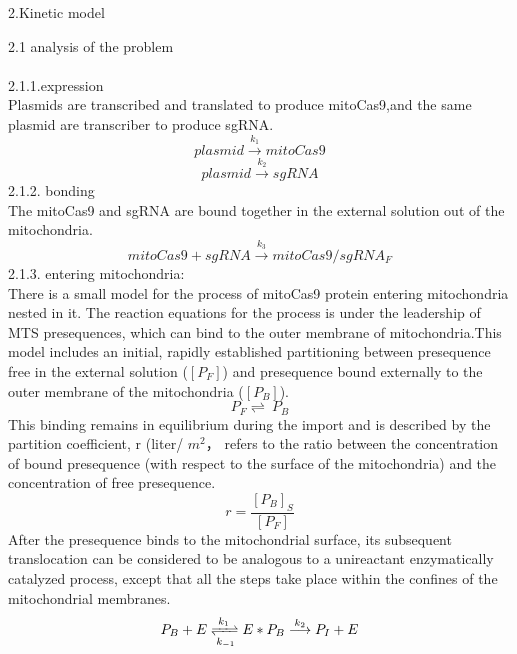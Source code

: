 \documentclass[UTF8]{ctexart}
\begin{document}
	\begin{center}
	{\Large 2.Kinetic model} 
    \end{center}
  {\Large 2.1 analysis of the problem} 
\\\\
2.1.1.expression \\
Plasmids are transcribed and translated to produce mitoCas9,and the same plasmid are transcriber to produce sgRNA.
	\begin{displaymath}
	plasmid \stackrel{k_1}{\longrightarrow} mitoCas9 
	\end{displaymath}
	\begin{displaymath}
	plasmid\stackrel{k_2}{\longrightarrow}sgRNA
	\end{displaymath}
	2.1.2. bonding \\
	The mitoCas9 and sgRNA are bound together in the external solution out of the mitochondria.
	\begin{displaymath}
	mitoCas9+sgRNA\stackrel{k_3}{\longrightarrow}mitoCas9/sgRNA_F
	\end{displaymath}
	2.1.3. entering mitochondria:\\
There is a small model for the process of mitoCas9 protein entering mitochondria nested in it.
The reaction equations for the process is under the leadership of MTS presequences, which can bind to the outer membrane of mitochondria.This
model includes an initial, rapidly established partitioning between presequence free in the external solution ($[P_F]$) and presequence bound externally to the outer membrane of the mitochondria ($[P_B]$). 
\begin{displaymath}
P_F\rightleftharpoons\ P_B
\end{displaymath}
 This binding remains in equilibrium dur­ing the import and is described by  the partition  coefficient,  r (liter/ 
$m^2$， refers  to the  ratio
between the concentration of bound presequence (with re­spect to the surface of the mitochondria) and the concentra­tion of free presequence.
\begin{displaymath}
r=\frac{[P_B]_S}{[P_F]}
\end{displaymath}
After the presequence binds to the mitochondrial surface, its
subsequent translocation can be considered to be analogous to a unireactant enzymatically catalyzed process, except that all the steps take place within the confines of the mitochon­drial membranes.
\begin{displaymath}
P_B+E \xrightleftharpoons[k_{-1}]{k_1}  E * P_B \stackrel{k_2}{\longrightarrow} P_I+E
\end{displaymath}
\end{document}
